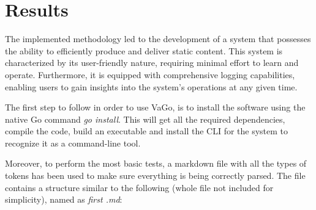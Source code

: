 

\chapter{Results}\label{ch:results}

The implemented methodology led to the development of a system that possesses the ability to efficiently produce and
deliver static content.
This system is characterized by its user-friendly nature, requiring minimal effort to learn
and operate.
Furthermore, it is equipped with comprehensive logging capabilities, enabling users to gain insights into the
system's operations at any given time.

The first step to follow in order to use VaGo, is to install the software using the native Go command \emph{go install}.
This will get all the required dependencies, compile the code, build an executable and install the CLI for the system
to recognize it as a command-line tool.

Moreover, to perform the most basic tests, a markdown file with all the types of tokens has been used to make sure
everything is
being correctly parsed.
The file contains a structure similar to the following (whole file not included for simplicity), named as \emph{first
.md}:

